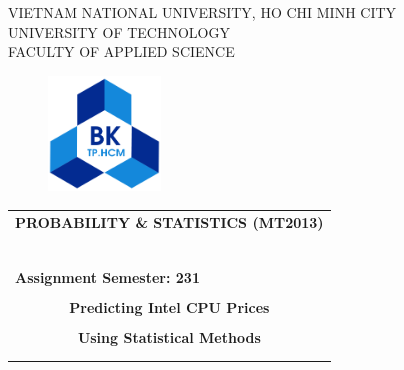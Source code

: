 \documentclass[12pt]{article}
\begin{document}
\begin{titlepage}
\begin{center}
VIETNAM NATIONAL UNIVERSITY, HO CHI MINH CITY \\
UNIVERSITY OF TECHNOLOGY \\
FACULTY OF APPLIED SCIENCE
\end{center}

\vspace{1cm}

\begin{figure}[h!]
\begin{center}
\includegraphics[width=3cm]{graphics/hcmut.png}
\end{center}
\end{figure}


\begin{center}
\begin{tabular}{c}
\multicolumn{1}{l}{\textbf{{\Large PROBABILITY \& STATISTICS (MT2013)}}}\\
~~\\
\hline
\\
\multicolumn{1}{l}{\textbf{{Assignment Semester: 231}}}\\
\\
\textbf{{\Huge Predicting Intel CPU Prices}}\\
\\
\textbf{{\Huge Using Statistical Methods}}\\[10pt]

\multicolumn{1}{l}{\textbf{{}}}\\
\\
\hline
\end{tabular}
\end{center}

\vspace{0.5cm}


\end{titlepage}
\end{document}
